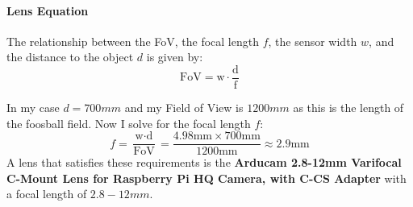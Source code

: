 \paragraph{Lens Equation}\label{par:lens_equation}

The relationship between the FoV, the focal length $f$, the sensor width $w$, and the distance to the object $d$ is given by:
\begin{equation}
    \text{FoV} = \text{w} \cdot \frac{\text{d}}{\text{f}}\label{eq:lens_equation}
\end{equation}


\noindent In my case $d = 700mm$ and my Field of View is $1200mm$ as this is the length of the foosball field.
Now I solve for the focal length $f$:
\begin{equation}
    \label{eq:focal_length}
    f = \frac{\text{w} \cdot \text{d}}{\text{FoV}} = \frac{4.98\text{mm} \times 700\text{mm}}{1200\text{mm}} \approx 2.9\text{mm}
\end{equation}
A lens that satisfies these requirements is the \textbf{Arducam 2.8-12mm Varifocal C-Mount Lens for Raspberry Pi HQ Camera, with C-CS Adapter} with a focal length of $2.8-12mm$.